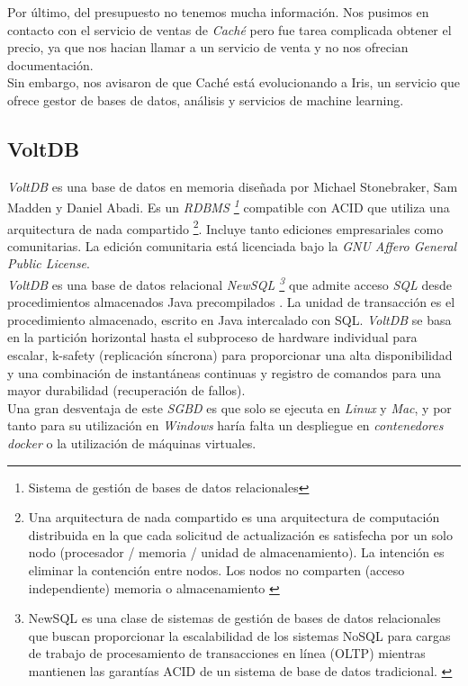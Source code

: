 \documentclass[10pt]{article}
\begin{document}
Por último, del presupuesto no tenemos mucha información. Nos pusimos en contacto con el servicio de ventas de \emph{Caché} pero fue tarea complicada obtener el precio, ya que nos hacian llamar a un servicio de venta y no nos ofrecian documentación.\\ Sin embargo, nos avisaron de que Caché está evolucionando a Iris, un servicio que ofrece gestor de bases de datos, análisis y servicios de machine learning.\\

\subsection{VoltDB}
\emph{VoltDB} es una base de datos en memoria diseñada por Michael Stonebraker, Sam Madden y Daniel Abadi. Es un \emph{RDBMS \footnote{Sistema de gestión de bases de datos relacionales }} compatible con ACID que utiliza una arquitectura de nada compartido \footnote{Una arquitectura de nada compartido es una arquitectura de computación distribuida en la que cada solicitud de actualización es satisfecha por un solo nodo (procesador / memoria / unidad de almacenamiento). La intención es eliminar la contención entre nodos. Los nodos no comparten (acceso independiente) memoria o almacenamiento \cite{VOLT:1}}. Incluye tanto ediciones empresariales como comunitarias. La edición comunitaria está licenciada bajo la \emph{GNU Affero General Public License}. \cite{VOLT:2}\\

\emph{VoltDB} es una base de datos relacional \emph{NewSQL \footnote{NewSQL es una clase de sistemas de gestión de bases de datos relacionales que buscan proporcionar la escalabilidad de los sistemas NoSQL para cargas de trabajo de procesamiento de transacciones en línea (OLTP) mientras mantienen las garantías ACID de un sistema de base de datos tradicional. \cite{VOLT:3}}} que admite acceso \emph{SQL} desde procedimientos almacenados Java precompilados . La unidad de transacción es el procedimiento almacenado, escrito en Java intercalado con SQL. \emph{VoltDB} se basa en la partición horizontal hasta el subproceso de hardware individual para escalar, k-safety (replicación síncrona) para proporcionar una alta disponibilidad y una combinación de instantáneas continuas y registro de comandos para una mayor durabilidad (recuperación de fallos).\cite{VOLT:2}\\

Una gran desventaja de este \emph{SGBD} es que solo se ejecuta en \emph{Linux} y \emph{Mac}, y por tanto para su utilización en \emph{Windows} haría falta un despliegue en \emph{contenedores docker} o la utilización de máquinas virtuales. \cite{VOLT:4} \\
\end{document}
